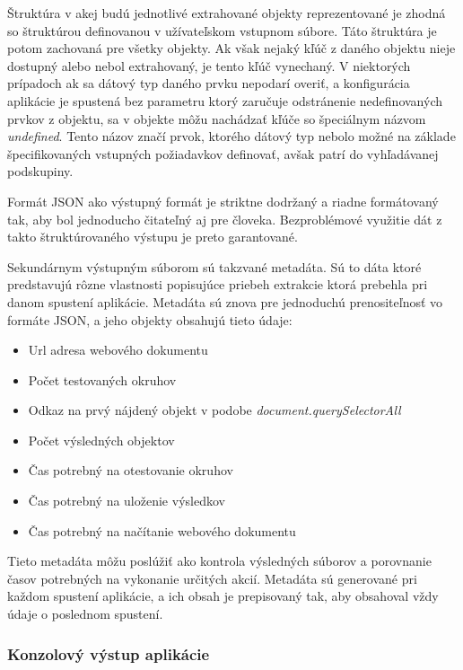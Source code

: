 \bigskip

Štruktúra v akej budú jednotlivé extrahované objekty reprezentované je zhodná so štruktúrou definovanou v užívateľskom vstupnom súbore. Táto štruktúra je potom zachovaná pre všetky objekty. Ak však nejaký kľúč z daného objektu nieje dostupný alebo nebol extrahovaný, je tento kľúč vynechaný. V niektorých prípadoch ak sa dátový typ daného prvku nepodarí overiť, a konfigurácia aplikácie je spustená bez parametru ktorý zaručuje odstránenie nedefinovaných prvkov z objektu, sa v objekte môžu nachádzať kľúče so špeciálnym názvom \textit{undefined}. Tento názov značí prvok, ktorého dátový typ nebolo možné na základe špecifikovaných vstupných požiadavkov definovať, avšak patrí do vyhľadávanej podskupiny.

Formát JSON ako výstupný formát je striktne dodržaný a riadne formátovaný tak, aby bol jednoducho čitateľný aj pre človeka. Bezproblémové využitie dát z takto štruktúrovaného výstupu je preto garantované.

\bigskip

Sekundárnym výstupným súborom sú takzvané metadáta. Sú to dáta ktoré predstavujú rôzne vlastnosti popisujúce priebeh extrakcie ktorá prebehla pri danom spustení aplikácie. Metadáta sú znova pre jednoduchú prenositeľnosť vo formáte JSON, a jeho objekty obsahujú tieto údaje:

\begin{itemize}
    \item {Url adresa webového dokumentu}
    \item {Počet testovaných okruhov}
    \item {Odkaz na prvý nájdený objekt v podobe \textit{document.querySelectorAll}}
    \item {Počet výsledných objektov}
    \item {Čas potrebný na otestovanie okruhov}
    \item {Čas potrebný na uloženie výsledkov}
    \item {Čas potrebný na načítanie webového dokumentu}
\end{itemize}

\bigskip

Tieto metadáta môžu poslúžiť ako kontrola výsledných súborov a porovnanie časov potrebných na vykonanie určitých akcií. Metadáta sú generované pri každom spustení aplikácie, a ich obsah je prepisovaný tak, aby obsahoval vždy údaje o poslednom spustení.

\newpage

\subsubsection{Konzolový výstup aplikácie}

